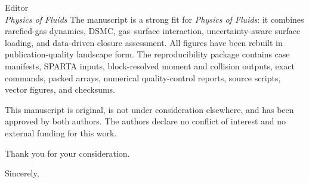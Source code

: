 \documentclass[11pt]{letter}
\begin{document}
\begin{letter}{Editor\\\emph{Physics of Fluids}}
The manuscript is a strong fit for \emph{Physics of Fluids}: it combines rarefied-gas dynamics, DSMC, gas--surface interaction, uncertainty-aware surface loading, and data-driven closure assessment. All figures have been rebuilt in publication-quality landscape form. The reproducibility package contains case manifests, SPARTA inputs, block-resolved moment and collision outputs, exact commands, packed arrays, numerical quality-control reports, source scripts, vector figures, and checksums.

This manuscript is original, is not under consideration elsewhere, and has been approved by both authors. The authors declare no conflict of interest and no external funding for this work.

Thank you for your consideration.

\closing{Sincerely,}
\end{letter}
\end{document}
